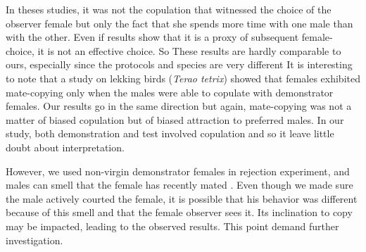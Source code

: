 \documentclass[a4paper, 12pt]{article}
\begin{document}
In theses studies, it was not the copulation that witnessed the choice of the observer female but only the fact that she spends more time with one male than with the other\parencite{dugatkin_lee_alan_reversal_1992,galef_mate-choice_1998}. Even if \textcite{bischoff_tail_1985} results show that it is a proxy of subsequent female-choice, it is not an effective choice. So These results are hardly comparable to ours, especially since the protocols and species are very different
It is interesting to note that a study on lekking birds (\textit{Terao tetrix}) showed that females exhibited mate-copying only when the males were able to copulate with demonstrator females\parencite{}. Our results go in the same direction but again, mate-copying was not a matter of biased copulation but of biased attraction to preferred males. In our study, both demonstration and test involved copulation and so it leave little doubt about interpretation. 

However, we used non-virgin demonstrator females in rejection experiment, and males can smell that the female has recently mated \parencite{jallon_few_1984}. 
Even though we made sure the male actively courted the female, it is possible that his behavior was different because of this smell and that the female observer sees it. 
Its inclination to copy may be impacted, leading to the observed results. 
This point demand further investigation.
\end{document}
